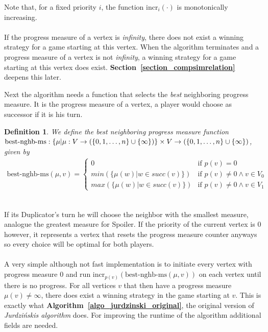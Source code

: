 \documentclass[12pt,oneside,bibliography=totoc,abstracton]{scrartcl}
\newcommand{\sectionref}[1]{\textbf{Section~\ref{#1}}}
\newcommand{\algoref}[1]{\textbf{Algorithm~\ref{#1}}}
\newtheorem{mydef}{Definition}
\begin{document}
Note that, for a fixed priority $i$, the function $\text{incr}_i(\cdot)$ is monotonically increasing.\\\\
If the progress measure of a vertex is \textit{infinity}, there does not exist a winning strategy for a
game starting at this vertex. When the algorithm terminates and a progress measure of a vertex is not
\textit{infinity}, a winning strategy for a game starting at this vertex does exist.
\sectionref{section_compsimrelation} deepens this later.

Next the algorithm needs a function that selects the \textit{best} neighboring progress measure.
It is the progress measure of a vertex, a player would choose as successor if it is his turn.
\begin{mydef}
	We define the \textnormal{best neighboring progress measure function} $\text{best-nghb-ms}:
	\{\mu | \mu: V \to (\{0, 1, \ldots, n\} \cup \{\infty\})\} \times V \to\\
	(\{0, 1, \ldots, n\} \cup \{\infty\})$, given by
	\begin{align*}
		\text{best-nghb-ms}(\mu, v) = \begin{cases} 0 & \text{if } p(v) = 0\\
								min\left(\{\mu(w) | w \in succ(v)\}\right) & \text{if } p(v) \neq 0 \land v \in V_0\\
								max\left(\{\mu(w) | w \in succ(v)\}\right) & \text{if } p(v) \neq 0 \land v \in V_1
							\end{cases}
	\end{align*}
\end{mydef}\quad\\
If its Duplicator's turn he will choose the neighbor with the smallest measure,
analogue the greatest measure for Spoiler.
If the priority of the current vertex is $0$ however, it represents a vertex that resets the progress measure counter anyways
so every choice will be optimal for both players.\\\\
A very simple although not fast implementation is to initiate every vertex with progress measure $0$
and run $\text{incr}_{p(v)}(\text{best-nghb-ms}(\mu, v))$ on each vertex until there is no progress. For all vertices $v$ that then
have a progress measure $\mu(v) \neq \infty$, there does exist a winning strategy in the game starting at $v$.
This is exactly what \algoref{algo_jurdzinski_original}, the original version of \textit{Jurdzi\'nskis algorithm} does.
For improving the runtime of the algorithm additional fields are needed.
\end{document}
